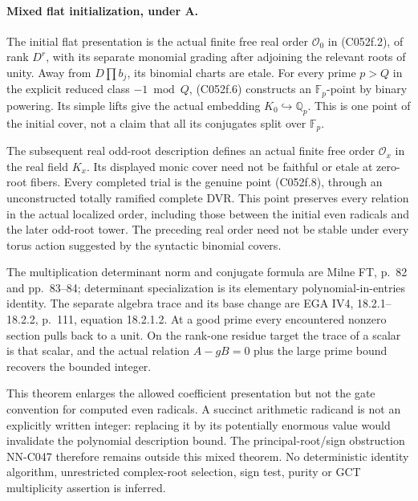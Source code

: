 \begin{geometricstatement}[NN-C052]
\paragraph{Mixed flat initialization, under A.}
The initial flat presentation is the actual finite free
real order \(\mathcal O_0\) in (C052f.2), of rank
\(D^r\), with its separate monomial grading after
adjoining the relevant roots of unity. Away from
\(D\prod b_j\), its binomial charts are etale.
For every prime \(p>Q\) in the explicit reduced
class \(-1\bmod Q\), (C052f.6) constructs an
\(\mathbb F_p\)-point by binary powering. Its
simple lifts give the actual embedding
\(K_0\hookrightarrow\mathbb Q_p\). This is one
point of the initial cover, not a claim that all
its conjugates split over \(\mathbb F_p\).

The subsequent real odd-root description defines
an actual finite free order \(\mathcal O_x\) in
the real field \(K_x\). Its displayed monic cover
need not be faithful or etale at zero-root fibers.
Every completed trial is the genuine point
(C052f.8), through an unconstructed totally ramified
complete DVR. This point preserves every relation
in the actual localized order, including those
between the initial even radicals and the later
odd-root tower. The preceding real order need not
be stable under every torus action suggested by
the syntactic binomial covers.

The multiplication determinant norm and conjugate
formula are Milne FT, p.~82 and pp.~83--84;
determinant specialization is its elementary
polynomial-in-entries identity. The separate
algebra trace and its base change are EGA IV4,
18.2.1--18.2.2, p.~111, equation 18.2.1.2.
At a good prime every encountered nonzero section
pulls back to a unit. On the rank-one residue
target the trace of a scalar is that scalar,
and the actual relation \(A-gB=0\) plus the large
prime bound recovers the bounded integer.

This theorem enlarges the allowed coefficient
presentation but not the gate convention for
computed even radicals. A succinct arithmetic
radicand is not an explicitly written integer:
replacing it by its potentially enormous value
would invalidate the polynomial description bound.
The principal-root/sign obstruction NN-C047
therefore remains outside this mixed theorem.
No deterministic identity algorithm, unrestricted
complex-root selection, sign test, purity or
GCT multiplicity assertion is inferred.


\end{geometricstatement}
